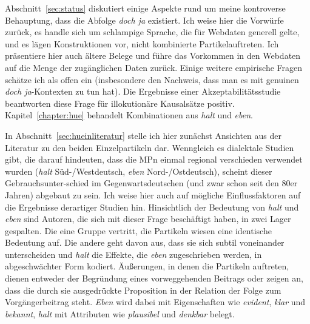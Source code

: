 Abschnitt~\ref{sec:status} diskutiert einige Aspekte rund um meine kontroverse Behauptung, dass die Abfolge \textit{doch ja} existiert. Ich weise hier die Vorwürfe zurück, es handle sich um schlampige Sprache, die für Webdaten generell gelte, und es lägen Konstruktionen vor, nicht kombinierte Partikelauftreten. Ich präsentiere hier auch ältere Belege und führe das Vorkommen in den Webdaten auf die Menge der zugänglichen Daten zurück. Einige weitere empirische Fragen schätze ich als offen ein (insbesondere den Nachweis, dass man es mit genuinen \textit{doch ja}-Kontexten zu tun hat). Die Ergebnisse einer Akzeptabilitätsstudie beantworten diese Frage für illokutionäre Kausalsätze positiv.\\

\noindent		
Kapitel~\ref{chapter:hue} behandelt Kombinationen aus \textit{halt} und \textit{eben}. 

In Abschnitt~\ref{sec:hueinliteratur} stelle ich hier zunächst Ansichten aus der Literatur zu den beiden Einzelpartikeln dar. Wenngleich es dialektale Studien gibt, die darauf hindeuten, dass die MPn einmal regional verschieden verwendet wurden (\textit{halt} \mbox{Süd-/}Westdeutsch, \textit{eben} Nord-/Ostdeutsch), scheint dieser Gebrauchsunter-\linebreak schied im Gegenwartsdeutschen (und zwar schon seit den 80er Jahren) abgebaut zu sein. Ich weise hier auch auf mögliche Einflussfaktoren auf die Ergebnisse derartiger Studien hin. Hinsichtlich der Bedeutung von \textit{halt} und \textit{eben} sind Autoren, die sich mit dieser Frage beschäftigt haben, in zwei Lager gespalten. Die eine Gruppe vertritt, die Partikeln wiesen eine identische Bedeutung auf. Die andere geht davon aus, dass sie sich subtil voneinander unterscheiden und \textit{halt} die Effekte, die \textit{eben} zugeschrieben werden, in abgeschwächter Form kodiert. Äußerungen, in denen die Partikeln auftreten, dienen entweder der Begründung eines vorweggehenden Beitrags oder zeigen an, dass die durch sie ausgedrückte Proposition in der Relation der Folge zum Vorgängerbeitrag steht. \textit{Eben} wird dabei mit Eigenschaften wie \textit{evident}, \textit{klar} und \textit{bekannt}, \textit{halt} mit Attributen wie \textit{plausibel} und \textit{denkbar} belegt. 

